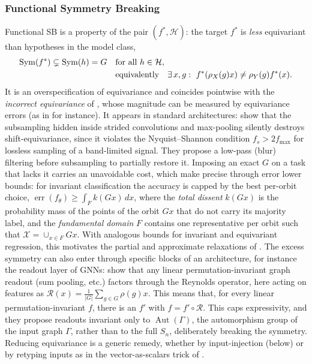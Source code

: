 \documentclass[mathematics,review,submit,moreauthors]{Definitions/mdpi}
\begin{document}
\subsubsection{Functional Symmetry Breaking}\label{sec:functional-sb}
Functional SB is a property of the pair $(f^*,\mathcal{H})$: the target $f^*$ is \emph{less} equivariant than hypotheses in the model class,
\begin{align}
\operatorname{Sym}(f^*)\subsetneq\operatorname{Sym}(h)=G\quad&\text{for all }h\in\mathcal{H},\\
&\text{equivalently}\quad \exists\,x,g:\ f^*(\rho_X(g)x)\neq\rho_Y(g)f^*(x).\notag
\end{align}
It is an overspecification of equivariance and coincides pointwise with the \emph{incorrect equivariance} of \citet{wang2023a}, whose magnitude can be measured by equivariance errors (as in  for instance).
It appears in standard architectures: \citet{zhang2019p3icml} show that the subsampling hidden inside strided convolutions and max-pooling silently destroys shift-equivariance, since it violates the Nyquist--Shannon condition $f_s>2f_{\max}$ for lossless sampling of a band-limited signal.
They propose a low-pass (blur) filtering before subsampling to partially restore it.
Imposing an exact $G$ on a task that lacks it carries an unavoidable cost, which \citet{wang2023a} make precise through error lower bounds: for invariant classification the accuracy is capped by the best per-orbit choice, $\operatorname{err}(f_\theta)\ge\int_F k(Gx)\,dx$, where the \emph{total dissent} $k(Gx)$ is the probability mass of the points of the orbit $Gx$ that do not carry its majority label, and the \emph{fundamental domain} $F$ contains one representative per orbit such that $\mathcal{X}=\cup_{x\in F}Gx$.
With analogous bounds for invariant and equivariant regression, this motivates the partial and approximate relaxations of .
The excess symmetry can also enter through specific blocks of an architecture, for instance the readout layer of GNNs: \citet{talhi2026} show that any linear permutation-invariant graph readout (sum pooling, etc.) factors through the Reynolds operator, here acting on features as $\mathcal{R}(x)=\frac{1}{|G|}\sum_{g\in G}\rho(g)x$.
This means that, for every linear permutation-invariant $f$, there is an $f'$ with $f=f'\circ\mathcal{R}$.
This caps expressivity, and they propose readouts invariant only to $\operatorname{Aut}(\Gamma)$, the automorphism group of the input graph $\Gamma$, rather than to the full $S_n$, deliberately breaking the symmetry.
Reducing equivariance is a generic remedy, whether by input-injection (below) or by retyping inputs as in the vector-as-scalars trick of \citet{vadgama2025}.
\end{document}
